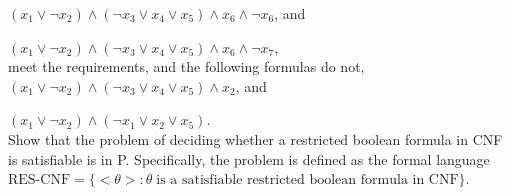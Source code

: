 \documentclass[11pt]{amsart}
\begin{document}
$(x_1 \vee \neg x_2 ) \wedge (\neg x_3 \vee x_4 \vee x_5 ) \wedge x_6 \wedge \neg x_6$, and

$(x_1 \vee \neg x_2 ) \wedge (\neg x_3 \vee x_4 \vee x_5 ) \wedge x_6 \wedge \neg x_7$, \\

meet the requirements, and the following formulas do not, \\

$(x_1 \vee \neg x_2 ) \wedge (\neg x_3 \vee x_4 \vee x_5 ) \wedge x_2$, and

$(x_1 \vee \neg x_2 ) \wedge (\neg x_1 \vee x_2 \vee x_5 )$. \\

Show that the problem of deciding whether a restricted boolean formula in CNF is satisfiable is in P. Specifically, the problem is defined as the formal language \\

$\textrm{RES-CNF} = \{ <\theta> : \theta \; \textrm{is a satisfiable restricted boolean formula in CNF} \}$. \\
\end{document}
